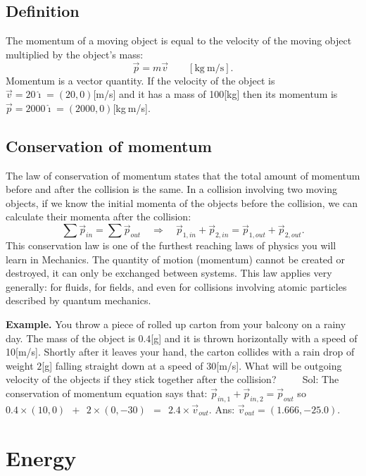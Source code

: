 \documentclass[letterpaper,9pt,journal]{IEEEtran}
\newcommand{\be}{\begin{equation}}
\newcommand{\ee}{\end{equation}}
\begin{document}
\vspace{-3mm}
\subsection{Definition}

The momentum of a moving object is equal to the velocity of the moving object 
multiplied by the object's mass:
\[ 
 \vec{p} = m\vec{v} \qquad [\text{kg}\:\text{m}/\text{s}].
\]
Momentum is a vector quantity.
If the velocity of the object is $\vec{v}=20\hat{\imath}=(20,0)$[m/s]
and it has a mass of 100[kg] then its momentum is $\vec{p}=2000\hat{\imath}=(2000,0)$[kg$\:$m/s].

\vspace{-3mm}
\subsection{Conservation of momentum}

The law of conservation of momentum states that the total amount of momentum before and
after the collision is the same. 
In a collision involving two moving objects, if we know the initial momenta
of the objects before the collision, we can calculate their momenta after the collision:
\be
 \sum \vec{p}_{in} = \sum \vec{p}_{out} \quad \Rightarrow \quad
  \vec{p}_{1,in} + \vec{p}_{2,in}  =    \vec{p}_{1,out} + \vec{p}_{2,out}.
  \label{CONSofMOMENTUM}
\ee
This conservation law is one of the furthest reaching laws of physics you will learn in Mechanics.
The quantity of motion (momentum) cannot be created or destroyed,  it can only be exchanged between systems.
This law applies very generally: for fluids, for fields, and even for collisions involving atomic particles 
described by quantum mechanics. 


{\bf Example.} 
You throw a piece of rolled up carton from your balcony on a rainy day.
The mass of the object is $0.4$[g] and it is thrown horizontally with a speed of 10[m/s].
Shortly after it leaves your hand, the carton collides with a rain drop of weight $2$[g]
falling straight down at a speed of $30$[m/s].
What will be outgoing velocity of the objects if they stick together after the collision?
$\qquad$ 
Sol: The conservation of momentum equation says that: $\vec{p}_{in,1} + \vec{p}_{in,2} = \vec{p}_{out}$
so $0.4\times (10,0) \ \ + \ \  2\times (0,-30) \ \  = \ \ 2.4 \times \vec{v}_{out}$.
Ans: $\vec{v}_{out} =(1.666, - 25.0)$.



\section{Energy}
\end{document}

